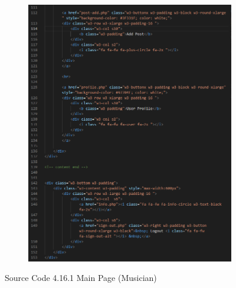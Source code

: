 \begin{enumerate}[1.]
\begin{figure}[h]
\begin{subfigure}[b]{0.6\textwidth}
            \includegraphics[width=\textwidth]{mainmatter/images/frontend/code/musicmain2.png}
            \label{fig:sub2}
        \end{subfigure}
        \caption*{Source Code 4.16.1 Main Page (Musician)}
        \label{fig:myfig55a}
    \end{figure}


\end{enumerate}
